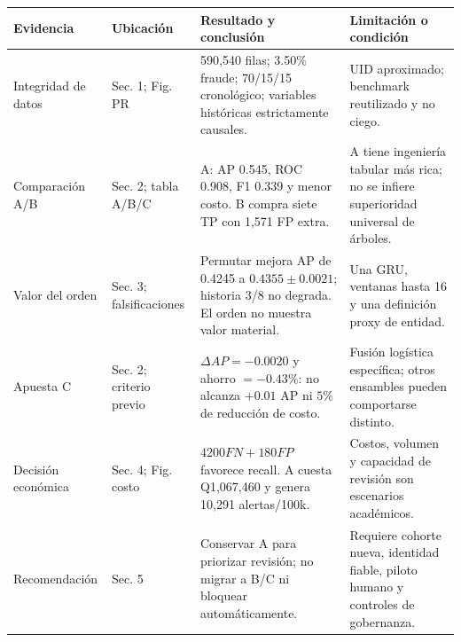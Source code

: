 \documentclass[10pt]{article}
\begin{document}
\footnotesize
\begin{tabularx}{\linewidth}{@{}p{2.05cm}p{2.15cm}Y Y@{}}
\toprule
\textbf{Evidencia} & \textbf{Ubicación} & \textbf{Resultado y conclusión} & \textbf{Limitación o condición}\\
\midrule
Integridad de datos & Sec. 1; Fig. PR & 590,540 filas; 3.50\% fraude; 70/15/15 cronológico; variables históricas estrictamente causales. & UID aproximado; benchmark reutilizado y no ciego.\\
\addlinespace
Comparación A/B & Sec. 2; tabla A/B/C & A: AP 0.545, ROC 0.908, F1 0.339 y menor costo. B compra siete TP con 1,571 FP extra. & A tiene ingeniería tabular más rica; no se infiere superioridad universal de árboles.\\
\addlinespace
Valor del orden & Sec. 3; falsificaciones & Permutar mejora AP de 0.4245 a $0.4355\pm0.0021$; historia 3/8 no degrada. El orden no muestra valor material. & Una GRU, ventanas hasta 16 y una definición proxy de entidad.\\
\addlinespace
Apuesta C & Sec. 2; criterio previo & $\Delta AP=-0.0020$ y ahorro $=-0.43\%$: no alcanza $+0.01$ AP ni $5\%$ de reducción de costo. & Fusión logística específica; otros ensambles pueden comportarse distinto.\\
\addlinespace
Decisión económica & Sec. 4; Fig. costo & $4200FN+180FP$ favorece recall. A cuesta Q1,067,460 y genera 10,291 alertas/100k. & Costos, volumen y capacidad de revisión son escenarios académicos.\\
\addlinespace
Recomendación & Sec. 5 & Conservar A para priorizar revisión; no migrar a B/C ni bloquear automáticamente. & Requiere cohorte nueva, identidad fiable, piloto humano y controles de gobernanza.\\
\bottomrule
\end{tabularx}
\end{document}
